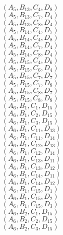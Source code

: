 \documentclass[14pt]{article}
\begin{document}
    $({A}_{5}, {B}_{13}, {C}_{4}, {D}_{8}) $ \\ 
    $({A}_{5}, {B}_{13}, {C}_{7}, {D}_{4}) $ \\ 
    $({A}_{5}, {B}_{13}, {C}_{8}, {D}_{4}) $ \\ 
    $({A}_{5}, {B}_{14}, {C}_{4}, {D}_{7}) $ \\ 
    $({A}_{5}, {B}_{14}, {C}_{4}, {D}_{8}) $ \\ 
    $({A}_{5}, {B}_{14}, {C}_{7}, {D}_{4}) $ \\ 
    $({A}_{5}, {B}_{14}, {C}_{8}, {D}_{4}) $ \\ 
    $({A}_{5}, {B}_{15}, {C}_{4}, {D}_{6}) $ \\ 
    $({A}_{5}, {B}_{15}, {C}_{6}, {D}_{4}) $ \\ 
    $({A}_{5}, {B}_{15}, {C}_{7}, {D}_{7}) $ \\ 
    $({A}_{5}, {B}_{15}, {C}_{7}, {D}_{8}) $ \\ 
    $({A}_{5}, {B}_{15}, {C}_{8}, {D}_{7}) $ \\ 
    $({A}_{5}, {B}_{15}, {C}_{8}, {D}_{8}) $ \\ 
    $({A}_{6}, {B}_{1}, {C}_{1}, {D}_{15}) $ \\ 
    $({A}_{6}, {B}_{1}, {C}_{2}, {D}_{15}) $ \\ 
    $({A}_{6}, {B}_{1}, {C}_{3}, {D}_{15}) $ \\ 
    $({A}_{6}, {B}_{1}, {C}_{11}, {D}_{13}) $ \\ 
    $({A}_{6}, {B}_{1}, {C}_{11}, {D}_{14}) $ \\ 
    $({A}_{6}, {B}_{1}, {C}_{12}, {D}_{13}) $ \\ 
    $({A}_{6}, {B}_{1}, {C}_{12}, {D}_{14}) $ \\ 
    $({A}_{6}, {B}_{1}, {C}_{13}, {D}_{11}) $ \\ 
    $({A}_{6}, {B}_{1}, {C}_{13}, {D}_{12}) $ \\ 
    $({A}_{6}, {B}_{1}, {C}_{14}, {D}_{11}) $ \\ 
    $({A}_{6}, {B}_{1}, {C}_{14}, {D}_{12}) $ \\ 
    $({A}_{6}, {B}_{1}, {C}_{15}, {D}_{1}) $ \\ 
    $({A}_{6}, {B}_{1}, {C}_{15}, {D}_{2}) $ \\ 
    $({A}_{6}, {B}_{1}, {C}_{15}, {D}_{3}) $ \\ 
    $({A}_{6}, {B}_{2}, {C}_{1}, {D}_{15}) $ \\ 
    $({A}_{6}, {B}_{2}, {C}_{2}, {D}_{15}) $ \\ 
    $({A}_{6}, {B}_{2}, {C}_{3}, {D}_{15}) $ \\ 
\end{document}
